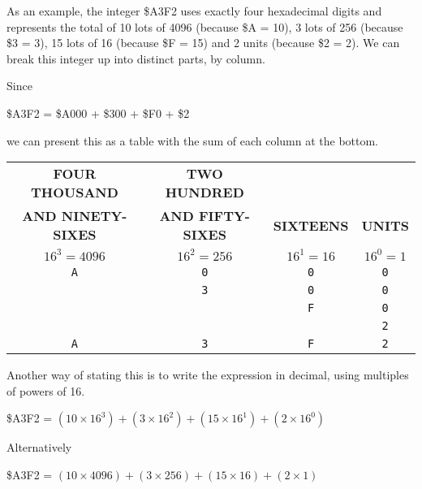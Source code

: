 As an example, the integer \$A3F2 uses exactly four hexadecimal digits and represents the total of 10 lots of 4096 (because \$A = 10), 3 lots of 256 (because \$3 = 3), 15 lots of 16 (because \$F = 15) and 2 units (because \$2 = 2). We can break this integer up into distinct parts, by column.

Since
\begin{center}
  \$A3F2 = \$A000 + \$300 + \$F0 + \$2
\end{center}
we can present this as a table with the sum of each column at the bottom.

\begin{center}
  \begin{tabular}{|c|c|c|c|}
  \hline
    \small{\bf FOUR THOUSAND} & \small{\bf TWO HUNDRED} &  &  \\
    \small{\bf AND NINETY-SIXES} & \small{\bf AND FIFTY-SIXES} & \small{\bf SIXTEENS} & \small{\bf UNITS} \\ \hline
	  \small{$16^{3} = 4096$} & \small{$16^{2} = 256$} & \small{$16^{1} = 16$} & \small{$16^{0} = 1$} \\ \hhline{|=|=|=|=|}
	  \large{\texttt{A}} & \large{\texttt{0}} & \large{\texttt{0}} & \large{\texttt{0}} \\ \hline
	            & \large{\texttt{3}} & \large{\texttt{0}} & \large{\texttt{0}} \\ \hline
	            &           & \large{\texttt{F}} & \large{\texttt{0}} \\ \hline
	            &           &           & \large{\texttt{2}} \\ \hhline{|=|=|=|=|}
	   \Large{\texttt{A}} & \Large{\texttt{3}}  & \Large{\texttt{F}}  & \Large{\texttt{2}} \\ \hline
  \end{tabular}
\end{center}

Another way of stating this is to write the expression in decimal, using multiples of powers of 16.

\begin{center}
  \$A3F2 = $(10 \times 16^{3}) + (3 \times 16^{2}) + (15 \times 16^{1}) + (2 \times 16^{0})$
\end{center}

Alternatively

\begin{center}
  \$A3F2 = $(10 \times 4096) + (3 \times 256) + (15 \times 16) + (2 \times 1)$
\end{center}

